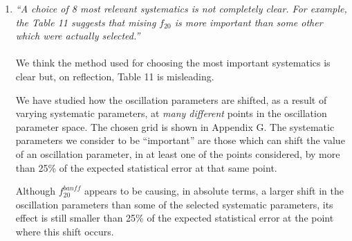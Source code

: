 \begin{enumerate}
Indeed, the effect of $f_{0}^{FSI}$ is negligible (as shown in Fig. 203)  
as there are not many $\nu_{\mu}$ and $\bar{\nu_{\mu}}$ CCQE events below 0.4 GeV
and, in addition, the corresponding element of the error matrix (Fig. 17) is very small.
The effect of $f_{4}^{FSI}$ is also negligible (as shown in Fig. 207) as there are not many 
$\nu_{e}$ and $\bar{\nu_{e}}$ CC events in the single $\mu$-like ring spectrum.
Simililarly, other systematic parameters included in this analysis have a negligible
effect (see, for example, the $\nu_{e}$ SuperK efficiency error, Fig. 168).
We think it is proper to implement all these nuisance parameters in the
single $\mu$-like ring event reconstructed energy spectrum p.d.f.
They parameterize uncertainties which exist and have been evaluated 
and this is sufficient enough motivation.
By implementing these nuisance parameters we can explicitly check
their effect on the oscillation parameter measurement.
However, as mentioned in various places in the main text,
we do not think it is necessary to include all nuisance parameters
in the oscillation fit.

\vspace{5 mm}
\item
{\em
   ``A choice of 8 most relevant systematics is not completely clear.
   For example, the Table 11 suggests that mising $f_{20}$ is more important
   than some other which were actually selected.''
}\\
\\
We think the method used for choosing the most important systematics is clear but,
on reflection, Table 11 is misleading.

We have studied how the oscillation parameters are shifted, as a result of varying systematic parameters,
at {\em many different} points in the oscillation parameter space.
The chosen grid is shown in Appendix G.
The systematic parameters we consider to be ``important'' are those which can shift the value of an oscillation
parameter, in at least one of the points considered, by more than 25\% of the expected statistical error 
at that same point.

Although $f_{20}^{banff}$ appears to be causing, in absolute terms, 
a larger shift in the oscillation parameters
than some of the selected systematic parameters,
its effect is still smaller than 
25\% of the expected statistical error at the point where this shift occurs.


\end{enumerate}
